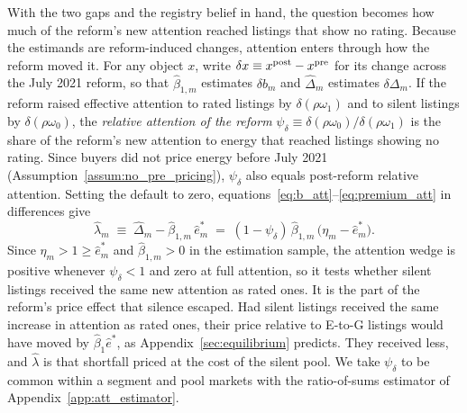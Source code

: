 With the two gaps and the registry belief in hand, the question becomes how much of the reform's new attention reached listings that show no rating. Because the estimands are reform-induced changes, attention enters through how the reform moved it. For any object $x$, write $\delta x\equiv x^{\rm post}-x^{\rm pre}$ for its change across the July 2021 reform, so that $\hat\beta_{1,m}$ estimates $\delta b_m$ and $\hat\Delta_m$ estimates $\delta\Delta_m$. If the reform raised effective attention to rated listings by $\delta(\rho\omega_1)$ and to silent listings by $\delta(\rho\omega_0)$, the \emph{relative attention of the reform} $\psi_\delta\equiv\delta(\rho\omega_0)/\delta(\rho\omega_1)$ is the share of the reform's new attention to energy that reached listings showing no rating. Since buyers did not price energy before July 2021 (Assumption~\ref{assum:no_pre_pricing}), $\psi_\delta$ also equals post-reform relative attention. Setting the default to zero, equations~\eqref{eq:b_att}--\eqref{eq:premium_att} in differences give
\begin{equation}
    \hat\lambda_m\;\equiv\;\hat\Delta_m-\hat\beta_{1,m}\,\hat e^*_m\;=\;(1-\psi_\delta)\,\hat\beta_{1,m}\,\big(\eta_m-\hat e^*_m\big).
    \label{eq:att_lambda}
\end{equation}
Since $\eta_m>1\ge\hat e^*_m$ and $\hat\beta_{1,m}>0$ in the estimation sample, the attention wedge is positive whenever $\psi_\delta<1$ and zero at full attention, so it tests whether silent listings received the same new attention as rated ones. It is the part of the reform's price effect that silence escaped. Had silent listings received the same increase in attention as rated ones, their price relative to E-to-G listings would have moved by $\hat\beta_1\hat e^*$, as Appendix~\ref{sec:equilibrium} predicts. They received less, and $\hat\lambda$ is that shortfall priced at the cost of the silent pool. We take $\psi_\delta$ to be common within a segment and pool markets with the ratio-of-sums estimator of Appendix~\ref{app:att_estimator}.

